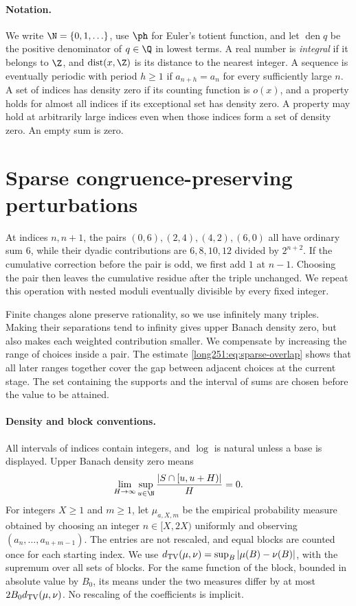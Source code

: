 \paragraph{Notation.}
We write $\N=\{0,1,\ldots\}$, use $\ph$ for Euler's totient function,
and let $\operatorname{den}q$ be the positive denominator of $q\in\Q$
in lowest terms.  A real number is \emph{integral} if it belongs to $\Z$,
and $\operatorname{dist}(x,\Z)$ is its distance to the nearest integer.
A sequence is eventually periodic with period $h\ge1$ if
$a_{n+h}=a_n$ for every sufficiently large $n$.  A set of indices has
density zero if its counting function is $o(x)$, and a property holds
for almost all indices if its exceptional set has density zero.
A property may hold at arbitrarily large indices even when those indices
form a set of density zero.  An empty sum is zero.

\section{Sparse congruence-preserving perturbations}
\label{long251:sec:paired-corrections}

At indices $n,n+1$, the pairs $(0,6),(2,4),(4,2),(6,0)$ all have
ordinary sum $6$, while their dyadic contributions are $6,8,10,12$
divided by $2^{n+2}$.  If the cumulative correction before the pair is
odd, we first add $1$ at $n-1$.  Choosing the pair then leaves the
cumulative residue after the triple unchanged.  We repeat this operation
with nested moduli eventually divisible by every fixed integer.

Finite changes alone preserve rationality, so we use infinitely many
triples.  Making their separations tend to infinity gives upper Banach
density zero, but also makes each weighted contribution smaller.  We
compensate by increasing the range of choices inside a pair.  The estimate
\eqref{long251:eq:sparse-overlap} shows that all later ranges together
cover the gap between adjacent choices at the current stage.
The set containing the supports and the interval of sums are chosen before the value to be attained.

\paragraph{Density and block conventions.}
All intervals of indices contain integers, and $\log$ is natural unless
a base is displayed.  Upper Banach density zero means
\[
 \lim_{H\to\infty}\sup_{u\in\N}\frac{|S\cap[u,u+H)|}{H}=0.
\]
For integers $X\ge1$ and $m\ge1$, let $\mu_{a,X,m}$ be the empirical
probability measure obtained by choosing an integer $n\in[X,2X)$ uniformly
and observing $(a_n,\ldots,a_{n+m-1})$.  The entries are not rescaled,
and equal blocks are counted once for each starting index.
We use $d_{\rm TV}(\mu,\nu)=\sup_B|\mu(B)-\nu(B)|$, with the supremum over all sets of blocks.  For the same function
of the block, bounded in absolute value by $B_0$, its means under the two
measures differ by at most $2B_0d_{\rm TV}(\mu,\nu)$.
No rescaling of the coefficients is implicit.

